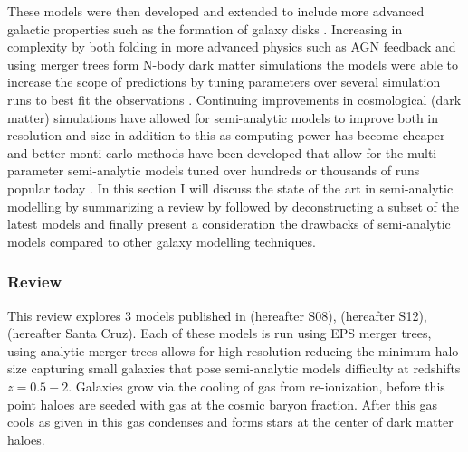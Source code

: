 
These models were then developed and extended to include more advanced galactic properties such as the formation of galaxy disks \citep{Mo1998TheDiscs}. Increasing in complexity by both folding in more advanced physics such as AGN feedback and using merger trees form N-body dark matter simulations the models were able to increase the scope of predictions by tuning parameters over several simulation runs to best fit the observations \citep{Bower2006BreakingFormation}. Continuing improvements in cosmological (dark matter) simulations have allowed for semi-analytic models to improve both in resolution and size in addition to this as computing power has become cheaper and better monti-carlo methods have been developed that allow for the multi-parameter semi-analytic models tuned over hundreds or thousands of runs popular today \citep{Guo2011FromCosmology,DeLucia2011TimesCosmology,Fontanot2011TheUniverse,Menci2014TriggeringInteractions,Somerville2015StarGas}.
In this section I will discuss the state of the art in semi-analytic modelling by summarizing a review by \citet{Somerville2015StarGas} followed by deconstructing a subset of the latest models and finally present a consideration the drawbacks of semi-analytic models compared to other galaxy modelling techniques.

\subsubsection{\citet{Somerville2015StarGas} Review}

This review explores 3 models published in \citet{Somerville2008ANuclei} (hereafter S08), \citet{Somerville2012GalaxyObservations} (hereafter S12), \citet{Porter2014ModellingSpace} (hereafter Santa Cruz). Each of these models is run using EPS merger trees, using analytic merger trees allows for high resolution reducing the minimum halo size capturing small galaxies that pose semi-analytic models difficulty at redshifts $z = 0.5 - 2$. Galaxies grow via the cooling of gas from re-ionization, before this point haloes are seeded with gas at the cosmic baryon fraction. After this gas cools as given in \cite{White1991GalaxyClustering} this gas condenses and forms stars at the center of dark matter haloes. 

